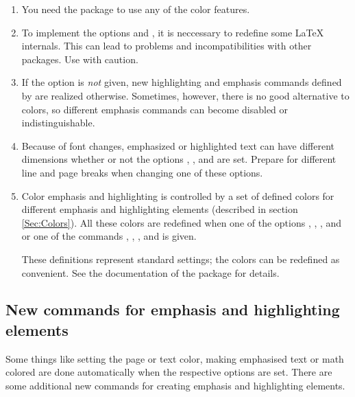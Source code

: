   \begin{enumerate}
  \item You need the  package to use any of the color features.

  \item To implement the options  and , it is neccessary to redefine some \LaTeX{}
    internals. This can lead to problems and incompatibilities with other packages. Use with caution.
    
  \item If the  option is \emph{not} given, new highlighting and emphasis commands defined by
     are realized otherwise. Sometimes, however, there is no good alternative to colors, so different
    emphasis commands can become disabled or indistinguishable.

    \newslide

  \item Because of font changes, emphasized or highlighted text can have different dimensions whether or not the options
    , , and  are set. Prepare for different line and page breaks
    when changing one of these options.
    
    \newslide

  \item Color emphasis and highlighting is controlled by a set of defined colors for different emphasis and highlighting
    elements (described in section \ref{Sec:Colors}). All these colors are redefined when one of the options
    , , , and  or one of the
    commands , , , and
     is given.
    
    These definitions represent standard settings; the colors can be redefined as convenient. See the documentation of
    the \href{ftp://ftp.dante.de/tex-archive/help/Catalogue/entries/color.html}{} package for details.
  \end{enumerate}

  \newslide

  \subsection{New commands for emphasis and highlighting elements}\label{Sec:Colorcommands}
  Some things like setting the page or text color, making emphasised text or math colored are done automatically when
  the respective options are set. There are some additional new commands for creating emphasis and highlighting
  elements.

